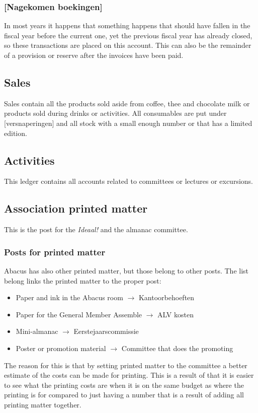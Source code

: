 \documentclass{report}
\begin{document}
\subsubsection{[Nagekomen boekingen]}
In most years it happens that something happens that should have fallen in the fiscal year before the current one, yet the previous fiscal year has already closed, so these transactions are placed on this account. This can also be the remainder of a provision or reserve after the invoices have been paid.  
\subsection{Sales}
Sales contain all the products sold aside from coffee, thee and chocolate milk or products sold during drinks or activities. All consumables are put under [versnaperingen] and all stock with a small enough number or that has a limited edition.     
\subsection{Activities}
This ledger contains all accounts related to committees or lectures or excursions.
\subsection{Association printed matter}
This is the post for the \textit{Ideaal!} and the almanac committee. 
\subsubsection{Posts for printed matter}
Abacus has also other printed matter, but those belong to other posts. The list belong links the printed matter to the proper post:
\begin{itemize}
\item Paper and ink in the Abacus room 		$\rightarrow$ Kantoorbehoeften
\item Paper for the General Member Assemble $\rightarrow$ ALV kosten
\item Mini-almanac $\rightarrow$ Eerstejaarscommissie
\item Poster or promotion material $\rightarrow$ Committee that does the promoting
\end{itemize}
The reason for this is that by setting printed matter to the committee a better estimate of the costs can be made for printing. This is a result of that it is easier to see what the printing costs are when it is on the same budget as where the printing is for compared to just having a number that is a result of adding all printing matter together.
\end{document}
